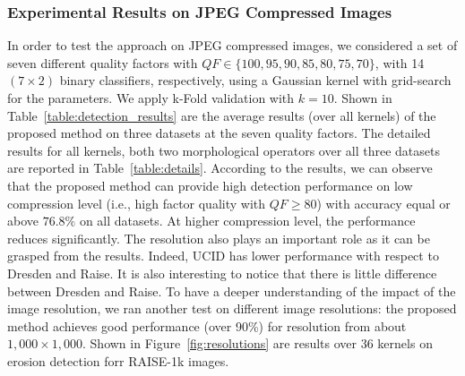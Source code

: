 \documentclass{ieeeaccess}
\begin{document}

\subsubsection{Experimental Results on JPEG Compressed Images}
%
In order to test the approach on JPEG compressed images, we considered a set of seven different quality factors with $QF \in \{100,95,90,85,80,75,70\}$, with 14 $(7\times 2)$ binary classifiers, respectively,
using a Gaussian kernel with grid-search for the parameters. We apply k-Fold validation with $k = 10$. Shown in Table~\ref{table:detection_results} are the average results (over all kernels) of the proposed method on three datasets at the seven quality factors. The detailed results for all kernels, both two morphological operators over all three datasets are reported in Table~\ref{table:details}. 
%
According to the results, we can observe that the proposed method can provide high detection performance on low compression level (i.e., high factor quality with $QF \ge 80$) with accuracy equal or above $76.8\%$ on all datasets. At higher compression level, the performance reduces significantly. The resolution also plays an important role as it can be grasped from the results. Indeed, UCID has lower performance with respect to Dresden and Raise. It is also interesting to notice that there is little difference between Dresden and Raise. To have a deeper understanding of the impact of the image resolution, we ran another test on different image resolutions: the proposed method achieves good performance (over 90\%) for resolution from about $1,000 \times 1,000$. Shown in Figure~\ref{fig:resolutions} are results over 36 kernels on erosion detection forr RAISE-1k images.%
\end{document}
